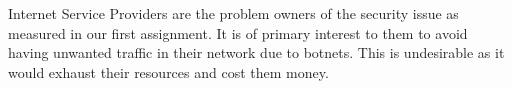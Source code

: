 Internet Service Providers are the problem owners of the security issue as measured in our first assignment. It is of primary interest to them to avoid having unwanted traffic in their network due to botnets. This is undesirable as it would exhaust their resources and cost them money.